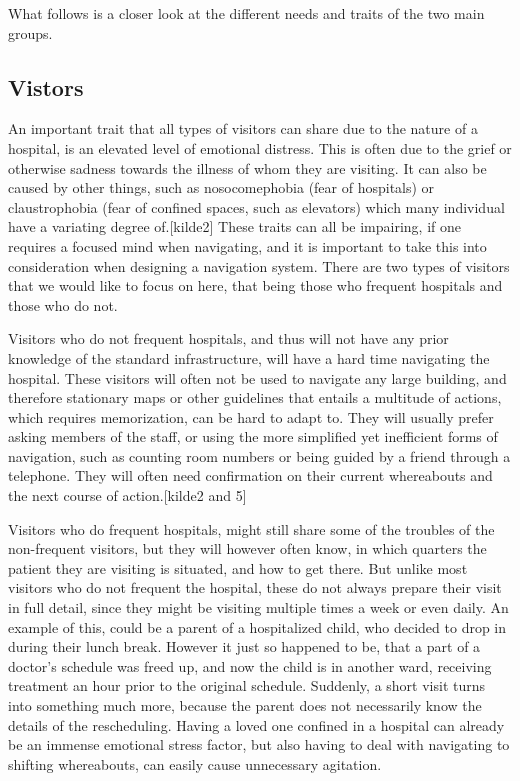 What follows is a closer look at the different needs and traits of the two main groups.

\subsection{Vistors} %
 \label{par:vistors}
 
An important trait that all types of visitors can share due to the nature of a hospital, is an elevated level of emotional distress. This is often due to the grief or otherwise sadness towards the illness of whom they are visiting. It can also be caused by other things, such as nosocomephobia (fear of hospitals) or claustrophobia (fear of confined spaces, such as elevators) which many individual have a variating degree of.[kilde2] These traits can all be impairing, if one requires a focused mind when navigating, and it is important to take this into consideration when designing a navigation system. There are two types of visitors that we would like to focus on here, that being those who frequent hospitals and those who do not.

Visitors who do not frequent hospitals, and thus will not have any prior knowledge of the standard infrastructure, will have a hard time navigating the hospital. These visitors will often not be used to navigate any large building, and therefore stationary maps or other guidelines that entails a multitude of actions, which requires memorization, can be hard to adapt to. They will usually prefer asking members of the staff, or using the more simplified yet inefficient forms of navigation, such as counting room numbers or being guided by a friend through a telephone. They will often need confirmation on their current whereabouts and the next course of action.[kilde2 and 5]

Visitors who do frequent hospitals, might still share some of the troubles of the non-frequent visitors, but they will however often know, in which quarters the patient they are visiting is situated, and how to get there. But unlike most visitors who do not frequent the hospital, these do not always prepare their visit in full detail, since they might be visiting multiple times a week or even daily. An example of this, could be a parent of a hospitalized child, who decided to drop in during their lunch break. However it just so happened to be, that a part of a doctor's schedule was freed up, and now the child is in another ward, receiving treatment an hour prior to the original schedule. Suddenly, a short visit turns into something much more, because the parent does not necessarily know the details of the rescheduling. Having a loved one confined in a hospital can already be an immense emotional stress factor, but also having to deal with navigating to shifting whereabouts, can easily cause unnecessary agitation.


